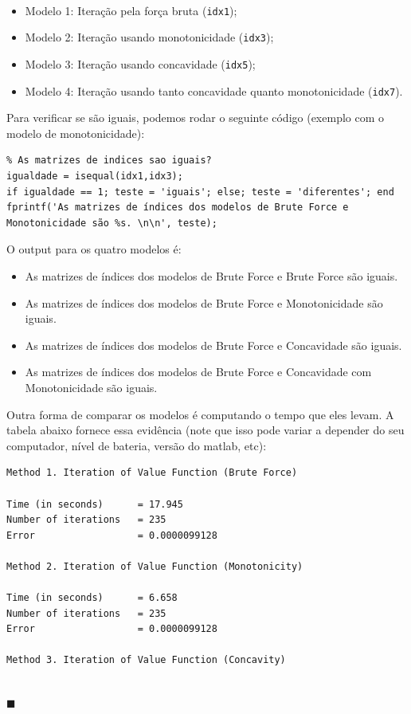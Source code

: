 \documentclass[10pt]{article}
\newcommand*{\QEDA}{\hfill\ensuremath{\blacksquare}}%
\newcommand\0{\mathbf{0}}
\newenvironment{sol}
    {\\[1em] {\color{magenta}\text{Resposta.}}
    }
    {{\color{blue!50!black}\QEDA}}
\begin{document}
\begin{enumerate}[wide]
\begin{sol}
\begin{itemize}
\item Modelo 1: Iteração pela força bruta (\texttt{idx1});
\item Modelo 2: Iteração usando monotonicidade (\texttt{idx3}); 
\item Modelo 3: Iteração usando concavidade (\texttt{idx5}); 
\item Modelo 4: Iteração usando tanto concavidade quanto monotonicidade (\texttt{idx7}).
\end{itemize}

Para verificar se são iguais, podemos rodar o seguinte código (exemplo com o modelo de monotonicidade): \vspace{-0.5cm}
\begin{lstlisting}
% As matrizes de indices sao iguais?
igualdade = isequal(idx1,idx3);
if igualdade == 1; teste = 'iguais'; else; teste = 'diferentes'; end
fprintf('As matrizes de índices dos modelos de Brute Force e Monotonicidade são %s. \n\n', teste);
\end{lstlisting}
O output para os quatro modelos é: 
\begin{itemize}
\item As matrizes de índices dos modelos de Brute Force e Brute Force são iguais. 
\item As matrizes de índices dos modelos de Brute Force e Monotonicidade são iguais. 
\item As matrizes de índices dos modelos de Brute Force e Concavidade são iguais.
\item As matrizes de índices dos modelos de Brute Force e Concavidade com Monotonicidade são iguais.
\end{itemize}

Outra forma de comparar os modelos é computando o tempo que eles levam. A tabela abaixo fornece essa evidência (note que isso pode variar a depender do seu computador, nível de bateria, versão do matlab, etc): \vspace{-0.3cm}
\begin{lstlisting}
Method 1. Iteration of Value Function (Brute Force) 

Time (in seconds)      = 17.945 
Number of iterations   = 235 
Error                  = 0.0000099128

Method 2. Iteration of Value Function (Monotonicity) 

Time (in seconds)      = 6.658 
Number of iterations   = 235 
Error                  = 0.0000099128 

Method 3. Iteration of Value Function (Concavity) 


\end{lstlisting}
\end{sol}
\end{enumerate}
\end{document}
